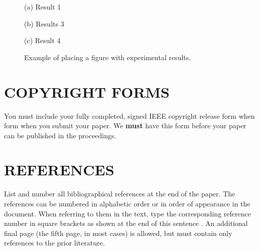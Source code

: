 \documentclass{article}
\begin{document}
\begin{figure}[htb]

\begin{minipage}[b]{1.0\linewidth}
  \centering
  \centerline{(a) Result 1}\medskip
\end{minipage}
%
\begin{minipage}[b]{.48\linewidth}
  \centering
  \centerline{(b) Results 3}\medskip
\end{minipage}
\hfill
\begin{minipage}[b]{0.48\linewidth}
  \centering
  \centerline{(c) Result 4}\medskip
\end{minipage}
%
\caption{Example of placing a figure with experimental results.}
\label{fig:res}
%
\end{figure}



\section{COPYRIGHT FORMS}
\label{sec:copyright}

You must include your fully completed, signed IEEE copyright release form when
form when you submit your paper. We {\bf must} have this form before your paper
can be published in the proceedings.

\section{REFERENCES}
\label{sec:ref}

List and number all bibliographical references at the end of the
paper. The references can be numbered in alphabetic order or in
order of appearance in the document. When referring to them in
the text, type the corresponding reference number in square
brackets as shown at the end of this sentence \cite{C2}. An
additional final page (the fifth page, in most cases) is
allowed, but must contain only references to the prior
literature.



\end{document}
